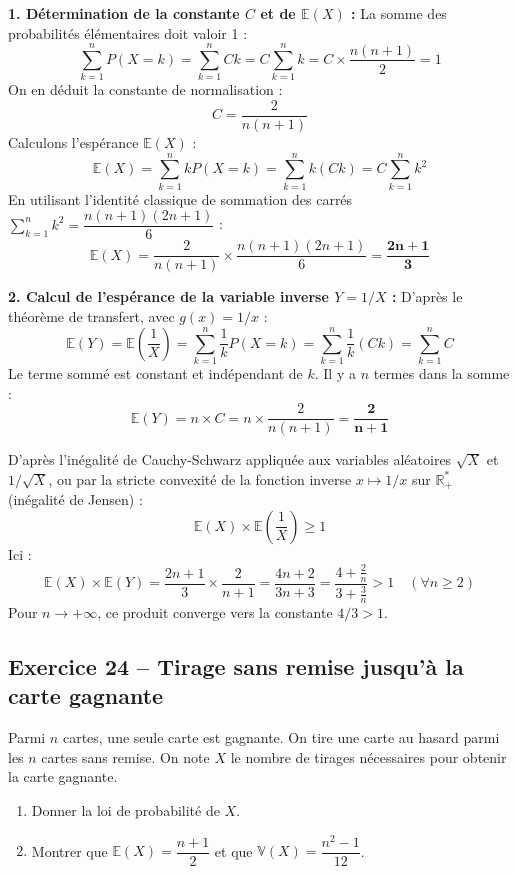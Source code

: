 \documentclass[11pt,a4paper]{article}
\newcommand{\R}{\mathbb{R}}
\newcommand{\E}{\mathbb{E}}
\newcommand{\V}{\mathbb{V}}
\begin{document}
\begin{correctionbox}
\textbf{1. Détermination de la constante $C$ et de $\E(X)$ :}
La somme des probabilités élémentaires doit valoir 1 :
\[
\sum_{k=1}^n P(X = k) = \sum_{k=1}^n C k = C \sum_{k=1}^n k = C \times \frac{n(n+1)}{2} = 1
\]
On en déduit la constante de normalisation :
\[
C = \frac{2}{n(n+1)}
\]
Calculons l'espérance $\E(X)$ :
\[
\E(X) = \sum_{k=1}^n k P(X = k) = \sum_{k=1}^n k (C k) = C \sum_{k=1}^n k^2
\]
En utilisant l'identité classique de sommation des carrés $\sum_{k=1}^n k^2 = \dfrac{n(n+1)(2n+1)}{6}$ :
\[
\E(X) = \frac{2}{n(n+1)} \times \frac{n(n+1)(2n+1)}{6} = \mathbf{\frac{2n + 1}{3}}
\]

\textbf{2. Calcul de l'espérance de la variable inverse $Y = 1/X$ :}
D'après le théorème de transfert, avec $g(x) = 1/x$ :
\[
\E(Y) = \E\left(\frac{1}{X}\right) = \sum_{k=1}^n \frac{1}{k} P(X = k) = \sum_{k=1}^n \frac{1}{k} (C k) = \sum_{k=1}^n C
\]
Le terme sommé est constant et indépendant de $k$. Il y a $n$ termes dans la somme :
\[
\E(Y) = n \times C = n \times \frac{2}{n(n+1)} = \mathbf{\frac{2}{n + 1}}
\]
\end{correctionbox}

\begin{remarquebox}
D'après l'inégalité de Cauchy-Schwarz appliquée aux variables aléatoires $\sqrt{X}$ et $1/\sqrt{X}$, ou par la stricte convexité de la fonction inverse $x \mapsto 1/x$ sur $\R_+^*$ (inégalité de Jensen) :
\[
\E(X) \times \E\left(\frac{1}{X}\right) \ge 1
\]
Ici :
\[
\E(X) \times \E(Y) = \frac{2n + 1}{3} \times \frac{2}{n + 1} = \frac{4n + 2}{3n + 3} = \frac{4 + \frac{2}{n}}{3 + \frac{3}{n}} > 1 \quad (\forall n \ge 2)
\]
Pour $n \to +\infty$, ce produit converge vers la constante $4/3 > 1$.
\end{remarquebox}

\vspace{0.3cm}

\subsection*{Exercice 24 -- Tirage sans remise jusqu'à la carte gagnante}

Parmi $n$ cartes, une seule carte est gagnante. On tire une carte au hasard parmi les $n$ cartes sans remise. On note $X$ le nombre de tirages nécessaires pour obtenir la carte gagnante.
\begin{enumerate}[label=\arabic*.]
    \item Donner la loi de probabilité de $X$.
    \item Montrer que $\E(X) = \dfrac{n+1}{2}$ et que $\V(X) = \dfrac{n^2 - 1}{12}$.
\end{enumerate}
\end{document}
